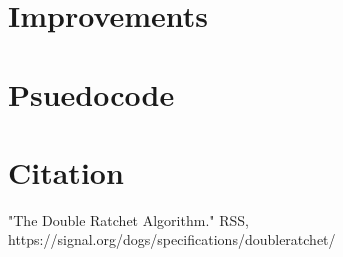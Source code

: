\documentclass{article}
\begin{document}
 \section{Improvements}

\section{Psuedocode}
    \begin{algorithm}
    \begin{algorithmic}

	\EndProcedure
    	\end{algorithmic}
    \end{algorithm}

\section{Citation}

"The Double Ratchet Algorithm." RSS, https://signal.org/dogs/specifications/doubleratchet/


    
	
	    
\end{document}

